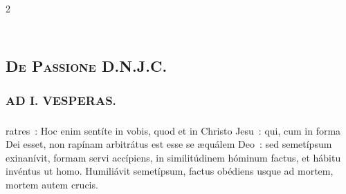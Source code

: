 \documentclass[9pt,twoside]{extarticle}
\begin{document}
\begin{multicols}{2}
{\subsection*{\center {}}
\subsection*{\center \textsc{\\ De Passione D.N.J.C.}}
\subsubsection*{\center {}}

\subsubsection*{\center \textsc{AD I. VESPERAS.}}
\subsubsection*{}
ratres~: Hoc enim sentíte in vobis, quod et in Christo Jesu~: qui, cum in forma Dei esset, non rapínam arbitrátus est esse se æquálem Deo~: sed semetípsum exinanívit, formam servi accípiens, in similitúdinem hóminum factus, et hábitu invéntus ut homo. Humiliávit semetípsum, factus obédiens usque ad mortem, mortem autem crucis.

}
\end{multicols}
\end{document}
